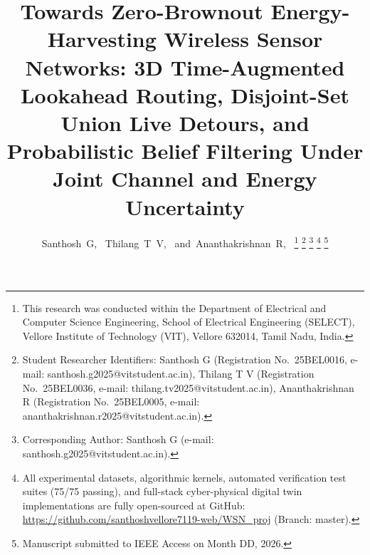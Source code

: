 \documentclass[journal]{IEEEtran}
\begin{document}
\title{Towards Zero-Brownout Energy-Harvesting Wireless Sensor Networks: 3D Time-Augmented Lookahead Routing, Disjoint-Set Union Live Detours, and Probabilistic Belief Filtering Under Joint Channel and Energy Uncertainty}

\author{Santhosh~G,~
        Thilang~T~V,~
        and~Ananthakrishnan~R,~%
\thanks{This research was conducted within the Department of Electrical and Computer Science Engineering, School of Electrical Engineering (SELECT), Vellore Institute of Technology (VIT), Vellore 632014, Tamil Nadu, India.}%
\thanks{Student Researcher Identifiers: Santhosh G (Registration No.~25BEL0016, e-mail: santhosh.g2025@vitstudent.ac.in), Thilang T V (Registration No.~25BEL0036, e-mail: thilang.tv2025@vitstudent.ac.in), Ananthakrishnan R (Registration No.~25BEL0005, e-mail: ananthakrishnan.r2025@vitstudent.ac.in).}%
\thanks{Corresponding Author: Santhosh G (e-mail: santhosh.g2025@vitstudent.ac.in).}%
\thanks{All experimental datasets, algorithmic kernels, automated verification test suites (75/75 passing), and full-stack cyber-physical digital twin implementations are fully open-sourced at GitHub: \url{https://github.com/santhoshvellore7119-web/WSN_proj} (Branch: master).}%
\thanks{Manuscript submitted to IEEE Access on Month DD, 2026.}}

\maketitle
\end{document}
